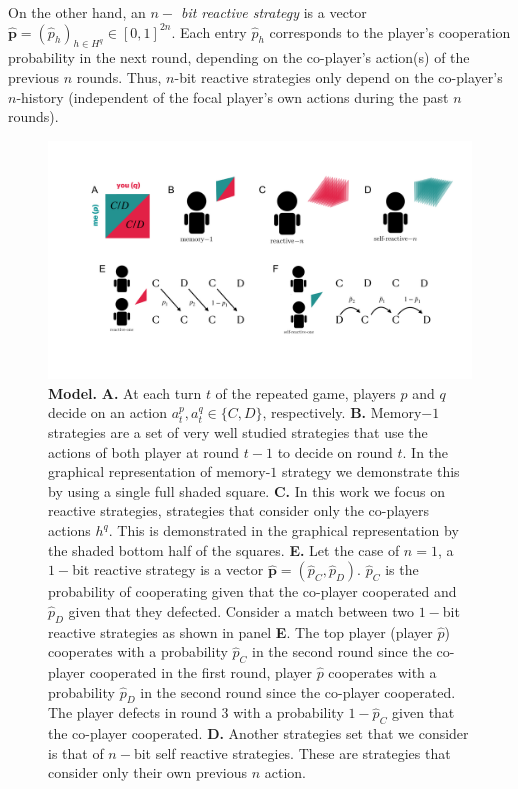 \documentclass{article}
\theoremstyle{definition}
\begin{document}
On the other hand, an {\it $n-$ bit reactive strategy} is a vector
$\mathbf{\hat{p}}=(\hat{p}_h)_{h\in H^q}\in[0,1]^{2n}$. Each entry $\hat{p}_h$
corresponds to the player's cooperation probability in the next round,
depending on the co-player's action(s) of the previous \(n\) rounds. Thus,
\(n\)-bit reactive strategies only depend on the co-player's \(n\)-history
(independent of the focal player's own actions during the past \(n\) rounds).

\begin{figure}[h!]
    \centering
    \includegraphics[width=.75\textwidth]{figures/conceptual_figure_model.pdf}
    \caption{\textbf{Model.} \textbf{A.} At each turn $t$ of the repeated game,
    players \(p\) and \(q\) decide on an action \(a^{p}_{t}, a^{q}_{t} \in \{C,
    D\}\), respectively. \textbf{B.} Memory$-1$ strategies are a set of very well
    studied strategies that use the actions of both player at round $t-1$ to
    decide on round $t$. In the graphical representation of memory-$1$ strategy
    we demonstrate this by using a single full shaded square. \textbf{C.} In this work we
    focus on reactive strategies, strategies that consider only the
    co-players actions $h^q$. This is demonstrated in the graphical representation
    by the shaded bottom half of the squares. \textbf{E.} Let the case of $n=1$, a $1-$bit
    reactive strategy is a vector $\mathbf{\hat{p}}=(\hat{p}_{C}, \hat{p}_{D})$. $\hat{p}_C$
    is the probability of cooperating given that the co-player cooperated and $\hat{p}_D$
    given that they defected. Consider a 
    match between two $1-$bit reactive strategies as shown in panel \textbf{E}. The top
    player (player $\hat{p}$) cooperates with a probability $\hat{p}_C$ in the
    second round since the co-player cooperated in the first round, player
    $\hat{p}$ cooperates with a probability $\hat{p}_D$ in the second round
    since the co-player cooperated. The player defects in round 3 with a probability $1 -
    \hat{p}_C$ given that the co-player cooperated. \textbf{D.} Another strategies set that
    we consider is that of $n-$bit self reactive strategies. These are strategies that
    consider only their own previous $n$ action.}
\end{figure}
\end{document}
